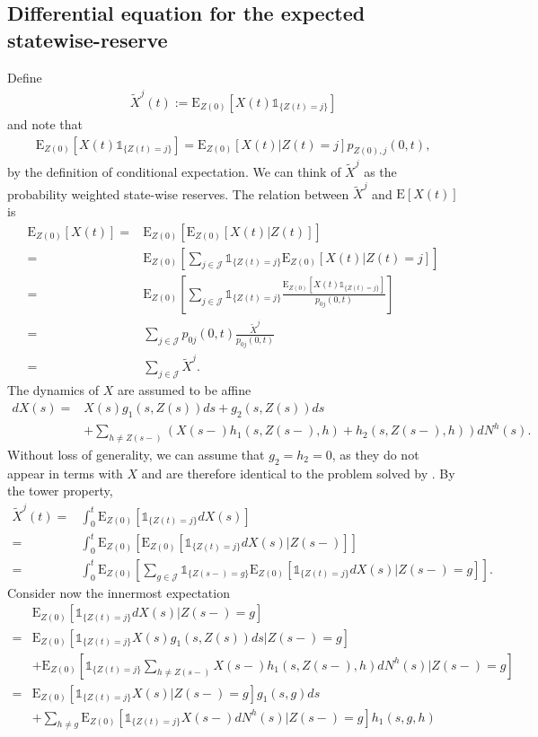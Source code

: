 \documentclass[12pt]{article}
\newcommand{\E}{\text{E}}
\newcommand{\indic}[1]{\mathds{1}_{ \{ #1 \} }}
\begin{document}
\subsection*{Differential equation for the expected statewise-reserve}
Define
\begin{align*}
\tilde{X}^j(t):=\E_{Z(0)}[X(t)\indic{Z(t)=j}]
\end{align*}
and note that
\begin{align}
\E_{Z(0)}[X(t)\indic{Z(t)=j}]= \E_{Z(0)}[X(t)|Z(t)=j]p_{Z(0),j}(0,t), \label{eq:1}
\end{align}
by the definition of conditional expectation. We can think of $\tilde{X}^j$ as the probability weighted state-wise reserves. The relation between $\tilde{X}^j$ and $\E[X(t)]$ is
\begin{align*}
\E_{Z(0)}[X(t)] =& \E_{Z(0)}[\E_{Z(0)} [ X(t)|Z(t)]] 
\\
=&
\E_{Z(0)} \left[ \sum_{j\in \mathcal{J}} \indic{Z(t)=j} \E_{Z(0)} [ X(t)|Z(t)=j] \right]
\\
=&
\E_{Z(0)} \left[ \sum_{j\in \mathcal{J}} \indic{Z(t)=j} \frac{\E_{Z(0)}[X(t)\indic{Z(t)=j}]}{p_{0j}(0,t)} \right]
\\
=&
\sum_{j\in \mathcal{J}} p_{0j}(0,t) \frac{ \tilde{X}^j}{p_{0j}(0,t)}
\\
=&
\sum_{j\in \mathcal{J}} \tilde{X}^j.
\end{align*}
The dynamics of $X$ are assumed to be affine
\begin{align*}
dX(s)=&X(s)g_1(s,Z(s))ds+g_2(s,Z(s))ds\\
&+\sum_{h\neq Z(s-)} \left( X(s-)h_1(s,Z(s-),h)+ h_2(s,Z(s-),h)\right) dN^h(s).
\end{align*}
Without loss of generality, we can assume that $g_2=h_2=0$, as they do not appear in terms with $X$ and are therefore identical to the problem solved by \citep{Norberg}.
By the tower property,
\begin{align*}
\tilde{X}^j(t)=& \int_0^t \E_{Z(0)}[\indic{Z(t)=j}dX(s)]
\\
=&
\int_0^t \E_{Z(0)}[ \E_{Z(0)}[ \indic{Z(t)=j} dX(s)|Z(s-)]]
\\
=&
\int_0^t \E_{Z(0)} \left[ \sum_{g \in \mathcal{J}} \indic{Z(s-)=g} \E_{Z(0)}[ \indic{Z(t)=j} dX(s)|Z(s-)=g ] \right].
\end{align*}
Consider now the innermost expectation
\begin{align}
&\E_{Z(0)}[ \indic{Z(t)=j} dX(s)|Z(s-)=g ] \nonumber \\
=&
\E_{Z(0)}[ \indic{Z(t)=j} X(s) g_1(s,Z(s))ds|Z(s-)=g] \nonumber
\\
&+ 
\E_{Z(0)} \left[ \indic{Z(t)=j} \sum_{h\neq Z(s-)}  X(s-)h_1(s,Z(s-),h) dN^h(s)|Z(s-)=g \right]\nonumber
\\
=&\E_{Z(0)}[ \indic{Z(t)=j} X(s)|Z(s-)=g]g_1(s,g) ds\label{eq:2}
\\
&+ 
\sum_{h\neq g} \E_{Z(0)}[ \indic{Z(t)=j}   X(s-) dN^h(s)|Z(s-)=g]h_1(s,g,h) \label{eq:3}
\end{align}
\end{document}

